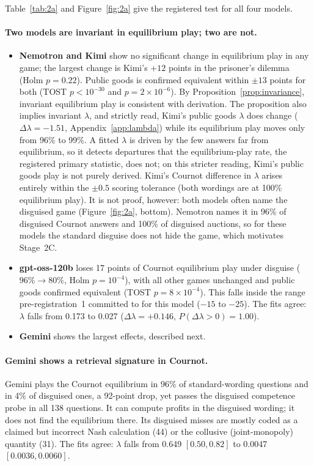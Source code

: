 \documentclass[11pt]{article}
\theoremstyle{definition}
\theoremstyle{remark}
\newcommand{\lam}{\lambda}
\begin{document}
Table~\ref{tab:2a} and Figure~\ref{fig:2a} give the registered test for all four models.

\paragraph{Two models are invariant in equilibrium play; two are not.}
\begin{itemize}
\item \textbf{Nemotron and Kimi} show no significant change in equilibrium play in any game; the
  largest change is Kimi's $+12$ points in the prisoner's dilemma (Holm $p=0.22$). Public goods
  is confirmed equivalent within $\pm13$ points for both (TOST $p<10^{-30}$ and
  $p=2\times10^{-6}$). By Proposition~\ref{prop:invariance}, invariant equilibrium play is
  consistent with derivation. The proposition also implies invariant $\lam$, and strictly read,
  Kimi's public goods $\lam$ does change ($\Delta\lam=-1.51$, Appendix~\ref{app:lambda}) while
  its equilibrium play moves only from 96\% to 99\%. A fitted $\lam$ is driven by the few
  answers far from equilibrium, so it detects departures that the equilibrium-play rate, the
  registered primary statistic, does not; on this stricter reading, Kimi's public goods play is
  not purely derived. Kimi's Cournot difference in $\lam$ arises entirely within the $\pm0.5$
  scoring tolerance (both wordings are at 100\% equilibrium play). It is not proof,
  however: both models often name the disguised game (Figure~\ref{fig:2a}, bottom). Nemotron
  names it in 96\% of disguised Cournot answers and 100\% of disguised auctions, so for these
  models the standard disguise does not hide the game, which motivates Stage~2C.
\item \textbf{gpt-oss-120b} loses 17 points of Cournot equilibrium play under disguise
  ($96\%\to80\%$, Holm $p=10^{-4}$), with all other games unchanged and public goods confirmed
  equivalent (TOST $p=8\times10^{-4}$). This falls inside the range pre-registration~1 committed
  to for this model ($-15$ to $-25$). The fits agree: $\lam$ falls from 0.173 to 0.027
  ($\Delta\lam=+0.146$, $P(\Delta\lam>0)=1.00$).
\item \textbf{Gemini} shows the largest effects, described next.
\end{itemize}

\paragraph{Gemini shows a retrieval signature in Cournot.} Gemini plays the Cournot equilibrium
in 96\% of standard-wording questions and in 4\% of disguised ones, a 92-point drop, yet passes the
disguised competence probe in all 138 questions. It can compute profits in the disguised
wording; it does not find the equilibrium there. Its disguised misses are mostly coded as a
claimed but incorrect Nash calculation (44) or the collusive (joint-monopoly) quantity (31). The
fits agree: $\lam$ falls from 0.649 $[0.50,0.82]$ to 0.0047 $[0.0036,0.0060]$.
\end{document}
